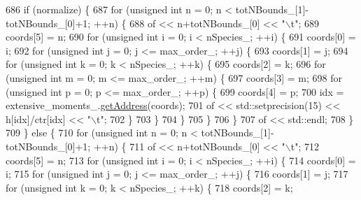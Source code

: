 \begin{DoxyCode}
686     \textcolor{keywordflow}{if} (normalize) \{
687         \textcolor{keywordflow}{for} (\textcolor{keywordtype}{unsigned} \textcolor{keywordtype}{int} n = 0; n < totNBounds\_[1]-totNBounds\_[0]+1; ++n) \{
688             of << n+totNBounds\_[0] << \textcolor{stringliteral}{"\(\backslash\)t"};
689             coords[5] = n;
690             \textcolor{keywordflow}{for} (\textcolor{keywordtype}{unsigned} \textcolor{keywordtype}{int} i = 0; i < nSpecies\_; ++i) \{
691                 coords[0] = i;
692                 \textcolor{keywordflow}{for} (\textcolor{keywordtype}{unsigned} \textcolor{keywordtype}{int} j = 0; j <= max\_order\_; ++j) \{
693                     coords[1] = j;
694                     \textcolor{keywordflow}{for} (\textcolor{keywordtype}{unsigned} \textcolor{keywordtype}{int} k = 0; k < nSpecies\_; ++k) \{
695                         coords[2] = k;
696                         \textcolor{keywordflow}{for} (\textcolor{keywordtype}{unsigned} \textcolor{keywordtype}{int} m = 0; m <= max\_order\_; ++m) \{
697                             coords[3] = m;
698                             \textcolor{keywordflow}{for} (\textcolor{keywordtype}{unsigned} \textcolor{keywordtype}{int} p = 0; p <= max\_order\_; ++p) \{
699                                 coords[4] = p;
700                                 idx = extensive\_moments\_.\hyperlink{classhistogram_ae52fa58934b56e05846a66e43c3184bd}{getAddress}(coords);
701                                 of << std::setprecision(15) << h[idx]/ctr[idx] << \textcolor{stringliteral}{"\(\backslash\)t"};
702                             \}
703                         \}
704                     \}
705                 \}
706             \}
707             of << std::endl;
708         \}
709     \} \textcolor{keywordflow}{else} \{
710         \textcolor{keywordflow}{for} (\textcolor{keywordtype}{unsigned} \textcolor{keywordtype}{int} n = 0; n < totNBounds\_[1]-totNBounds\_[0]+1; ++n) \{
711             of << n+totNBounds\_[0] << \textcolor{stringliteral}{"\(\backslash\)t"};
712             coords[5] = n;
713             \textcolor{keywordflow}{for} (\textcolor{keywordtype}{unsigned} \textcolor{keywordtype}{int} i = 0; i < nSpecies\_; ++i) \{
714                 coords[0] = i;
715                 \textcolor{keywordflow}{for} (\textcolor{keywordtype}{unsigned} \textcolor{keywordtype}{int} j = 0; j <= max\_order\_; ++j) \{
716                     coords[1] = j;
717                     \textcolor{keywordflow}{for} (\textcolor{keywordtype}{unsigned} \textcolor{keywordtype}{int} k = 0; k < nSpecies\_; ++k) \{
718                         coords[2] = k;

\end{DoxyCode}
